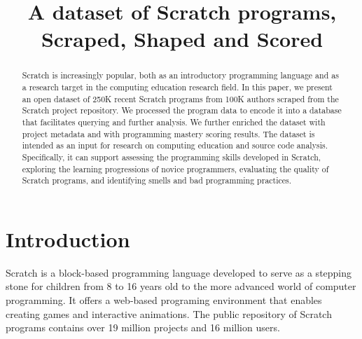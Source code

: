 \documentclass[10pt, conference]{IEEEtran}
\begin{document}
\title{A dataset of Scratch programs,\\Scraped, Shaped and Scored}


\author{
	
}

\maketitle


\begin{abstract}
Scratch is increasingly popular, both as an introductory programming language and as a research target in the computing education research field.	
In this paper, we present an open dataset of 250K recent Scratch programs from 100K authors scraped from the Scratch project repository.
We processed the program data to encode it into a database that facilitates querying and further analysis. We further enriched the dataset with project metadata and with programming mastery scoring results.
The dataset is intended as an input for research on computing education and source code analysis.
Specifically, it can support assessing the programming skills developed in Scratch, exploring the learning progressions of novice programmers, evaluating the quality of Scratch programs, and identifying smells and bad programming practices.
\end{abstract}
 
\section{Introduction}
Scratch \cite{resnick_scratch:_2009} is a block-based programming language developed to serve as a stepping stone for children from 8 to 16 years old to the more advanced world of computer programming.
It offers a web-based programing environment that enables creating games and interactive animations. The public repository of Scratch programs contains over 19 million projects and 16 million users.
\end{document}
